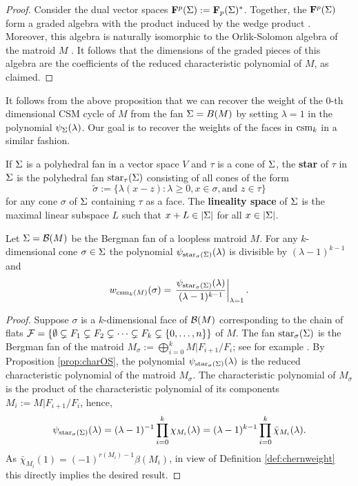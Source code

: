 \begin{proof}
Consider the dual vector spaces ${\mathbf F}^p(\Sigma) := {\mathbf F}_p(\Sigma)^*$. Together, the ${\mathbf F}^p(\Sigma)$ form a graded algebra with the product induced by the wedge product \cite[Lemma 2]{Zharkov:Bergman}. Moreover, this algebra is naturally isomorphic to the Orlik-Solomon algebra of the matroid $M$ \cite[Theorem 4]{Zharkov:Bergman}. It follows that the dimensions of the graded pieces of this algebra are the coefficients of the reduced characteristic polynomial of $M$, as claimed.  
\end{proof}

It follows from the above proposition that we can recover the weight of the $0$-th dimensional CSM cycle of $M$ from the fan $\Sigma = B(M)$ by setting $\lambda = 1$ in the polynomial ${\psi}_{\Sigma}(\lambda)$. 
Our goal is to recover the weights of the faces in $\operatorname{csm}_k$ in a similar fashion. 

If $\Sigma$ is a polyhedral fan in a vector space $V$ and $\tau$ is a cone of $\Sigma$, the \textbf{star} of 
$\tau$ in $\Sigma$ is the polyhedral fan $\operatorname{star}_\tau(\Sigma)$ consisting of all cones of the form
\[ \tilde{\sigma} := \{ \lambda(x - z) : \lambda \geq 0, x \in \sigma, \text{and } z \in \tau\}\]
for any cone $\sigma$ of $\Sigma$ containing $\tau$ as a face.
The \textbf{lineality space} of $\Sigma$ is the maximal linear subspace $L$ such that 
$x + L \in |\Sigma|$ for all  $x \in |\Sigma|$. 



\begin{lemma}\label{lem:sameweights}
Let $\Sigma = {\mathcal B}(M)$ be the Bergman fan of a loopless matroid $M$.
For any $k$-dimensional cone $\sigma \in \Sigma$ the polynomial $\psi_{{\operatorname{star}_{\sigma}(\Sigma)}}(\lambda)$
is divisible by $(\lambda -1)^{k-1}$ and
\begin{equation}\label{eqn:sameweights}
 w_{\operatorname{csm}_k(M)}(\sigma)
= \left.\frac{\psi_{{\operatorname{star}_{\sigma}(\Sigma)}}(\lambda)}{(\lambda -1)^{k-1}}\right|_{\lambda = 1}.
 \end{equation}
\end{lemma}

\begin{proof}
Suppose $\sigma$ is a $k$-dimensional face of ${\mathcal B}(M)$ corresponding to the chain of flats
$\mathcal F = \{\emptyset \subsetneq F_1 \subsetneq F_2 \subsetneq \dotsb \subsetneq F_k \subsetneq \{0,\dotsc, n\}\}$ of $M$. 
The fan $\operatorname{star}_{\sigma}(\Sigma)$ is the Bergman fan of the matroid 
$M_\sigma := \bigoplus_{i=0}^k M|F_{i+1}/F_i$; see for example \cite[Corollary 4.4.8]{MaclaganSturmfels}.
By Proposition \ref{prop:charOS}, the polynomial $\psi_{\operatorname{star}_{\sigma}(\Sigma)}(\lambda)$ is the reduced characteristic polynomial of the matroid $M_\sigma$.
The characteristic polynomial of $M_\sigma$ is the product of the characteristic polynomial of its components $M_i := M|F_{i+1}/F_i$, hence, 
$$\psi_{\operatorname{star}_{\sigma}(\Sigma)}(\lambda) = (\lambda -1)^{-1}\prod_{i = 0}^k \chi_{M_i}(\lambda) = (\lambda -1)^{k-1}\prod_{i = 0}^k \bar{\chi}_{M_i}(\lambda).$$ 
As $\bar{\chi}_{M_i}(1) = (-1)^{r(M_i)-1} \beta(M_i)$, in view of Definition \ref{def:chernweight} this directly implies the desired result. 
\end{proof}

